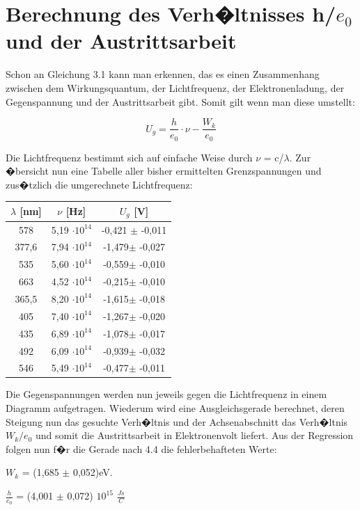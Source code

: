 \documentclass[a4paper, 10pt]{report}%
\begin{document}
\section{Berechnung des Verh�ltnisses h/$e_0$ und der Austrittsarbeit}

Schon an Gleichung 3.1 kann man erkennen, das es einen Zusammenhang zwischen dem Wirkungsquantum, der Lichtfrequenz, der Elektronenladung, der Gegenspannung und der Austrittsarbeit gibt. Somit gilt wenn man diese umstellt:

\begin{equation}
U_g = \frac{h}{e_0}\cdot \nu - \frac{W_k}{e_0}
\end{equation}

Die Lichtfrequenz bestimmt sich auf einfache Weise durch $\nu$ = c/$\lambda$. Zur �bersicht nun eine Tabelle aller bisher ermittelten Grenzspannungen und zus�tzlich die umgerechnete Lichtfrequenz:

\begin{center}
\begin{tabular}{c|c|c}
$\lambda$ [nm] & $\nu$ [Hz] & $U_g$ [V] \\
\hline
578 &5,19 $\cdot 10^{14}$ &-0,421 $\pm$	-0,011 \\
377,6&7,94 $\cdot 10^{14}$ &-1,479$\pm$	-0,027 \\
535&5,60 $\cdot 10^{14}$ &-0,559$\pm$	-0,010 \\
663&4,52 $\cdot 10^{14}$ &-0,215$\pm$	-0,010 \\
365,5&8,20 $\cdot 10^{14}$ &-1,615$\pm$	-0,018 \\
405&7,40 $\cdot 10^{14}$ &-1,267$\pm$	-0,020 \\
435&6,89 $\cdot 10^{14}$ &-1,078$\pm$	-0,017 \\
492&6,09 $\cdot 10^{14}$ &-0,939$\pm$	-0,032 \\
546&5,49 $\cdot 10^{14}$ &-0,477$\pm$	-0,011
\end{tabular}
\end{center}

Die Gegenspannungen werden nun jeweils gegen die Lichtfrequenz in einem Diagramm aufgetragen. Wiederum wird eine Ausgleichsgerade berechnet, deren Steigung nun das gesuchte Verh�ltnis und der Achsenabschnitt das Verh�ltnis $W_k/e_0$ und somit die Austrittsarbeit in Elektronenvolt liefert. Aus der Regression folgen nun f�r die Gerade nach 4.4 die fehlerbehafteten Werte:

$W_k$ = (1,685 $\pm$ 0,052)eV.

$\frac{h}{e_0}$ = (4,001 $\pm$ 0,072) \cdot $10^{15}$ $\frac{Js}{C}$
\end{document}
